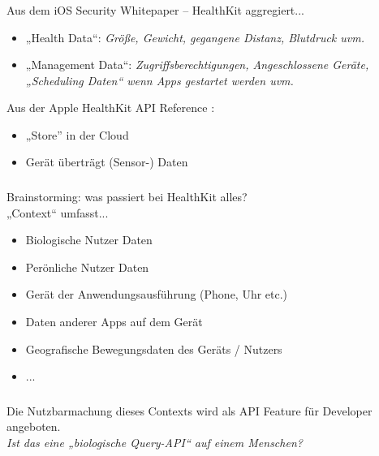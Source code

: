 \begin{frame}
    \frametitle{\insertsubsection}
    Aus dem iOS Security Whitepaper \cite{iosSecurity} -- HealthKit aggregiert...
    \vspace{.8em}
    \begin{itemize}
        \setlength\itemsep{0.6em}
        \item „Health Data“: \emph{Größe, Gewicht, gegangene Distanz, Blutdruck uvm.}
        \item „Management Data“: \emph{Zugriffsberechtigungen, Angeschlossene Geräte, „Scheduling Daten“ wenn Apps gestartet werden uvm.}
    \end{itemize}
    \vspace{.8em}
    Aus der Apple HealthKit API Reference \cite{hkApi}:
    \vspace{.8em}
    \begin{itemize}
        \setlength\itemsep{0.6em}
        \item „Store” in der Cloud
        \item Gerät überträgt (Sensor-) Daten
    \end{itemize}
\end{frame}

\begin{frame}
    \frametitle{\insertsubsection}
    Brainstorming: was passiert bei HealthKit alles?\\
    \vspace{1em}
    „Context“ umfasst...
    \vspace{1em}
    \begin{itemize}[<+->]
        \setlength\itemsep{0.8em}
        \item Biologische Nutzer Daten
        \item Perönliche Nutzer Daten
        \item Gerät der Anwendungsausführung (Phone, Uhr etc.)
        \item Daten anderer Apps auf dem Gerät
        \item Geografische Bewegungsdaten des Geräts / Nutzers
        \item ...
    \end{itemize}
\end{frame}

\begin{frame}
    \frametitle{\insertsubsection}
    \vspace{1em}
    Die Nutzbarmachung dieses Contexts wird als API Feature für Developer angeboten.\\
    \vspace{2em}
    \pause
    \emph{Ist das eine „biologische Query-API“ auf einem Menschen?}
    
\end{frame}